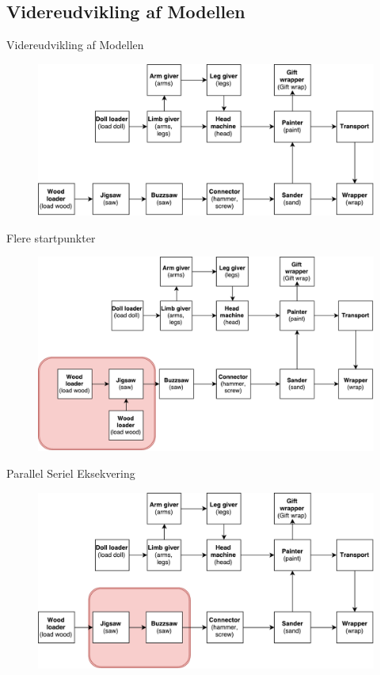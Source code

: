 \subsection{Videreudvikling af Modellen}
\begin{frame}{Videreudvikling af Modellen}{}
    \begin{figure}
    \centering
    \includegraphics[width=1\textwidth]{figures/runningexample.pdf}
  \end{figure}
\end{frame}


\begin{frame}{Flere startpunkter}{}
  \begin{figure}
    \centering
    \includegraphics[width=1\textwidth]{figures/startAt2Modules.pdf}
  \end{figure}
\end{frame}


\begin{frame}{Parallel Seriel Eksekvering}{}
  \begin{figure}
    \centering
    \includegraphics[width=1\textwidth]{figures/serialParallel.pdf}
  \end{figure}
\end{frame}


